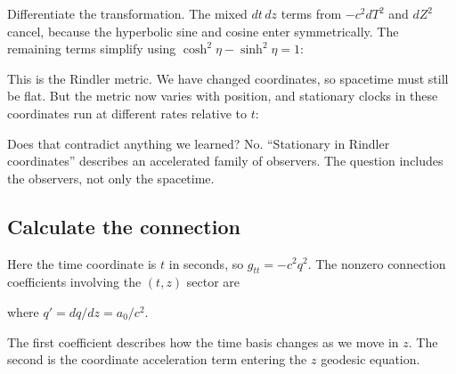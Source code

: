 \documentclass[
  11pt,
  letterpaper,
  oneside,
  openany]{scrbook}
\begin{document}
Differentiate the transformation. The mixed \(dt\,dz\) terms from
\(-c^2dT^2\) and \(dZ^2\) cancel, because the hyperbolic sine and cosine
enter symmetrically. The remaining terms simplify using
\(\cosh^2\eta-\sinh^2\eta=1\):

\begin{center}
\begingroup
{}
\ifdim\wd\grmathbox>\linewidth
\resizebox{\linewidth}{!}{\usebox{\grmathbox}}
\else\usebox{\grmathbox}\fi
\endgroup
\end{center}

This is the Rindler metric. We have changed coordinates, so spacetime
must still be flat. But the metric now varies with position, and
stationary clocks in these coordinates run at different rates relative
to \(t\):

\begin{center}
\begingroup
{}
\ifdim\wd\grmathbox>\linewidth
\resizebox{\linewidth}{!}{\usebox{\grmathbox}}
\else\usebox{\grmathbox}\fi
\endgroup
\end{center}

Does that contradict anything we learned? No. ``Stationary in Rindler
coordinates'' describes an accelerated family of observers. The question
includes the observers, not only the spacetime.

\hypertarget{calculate-the-connection}{%
\subsection{Calculate the connection}\label{calculate-the-connection}}

Here the time coordinate is \(t\) in seconds, so \(g_{tt}=-c^2q^2\). The
nonzero connection coefficients involving the \((t,z)\) sector are

\begin{center}
\begingroup
{}
\ifdim\wd\grmathbox>\linewidth
\resizebox{\linewidth}{!}{\usebox{\grmathbox}}
\else\usebox{\grmathbox}\fi
\endgroup
\end{center}

where \(q'=dq/dz=a_0/c^2\).

The first coefficient describes how the time basis changes as we move in
\(z\). The second is the coordinate acceleration term entering the \(z\)
geodesic equation.
\end{document}
